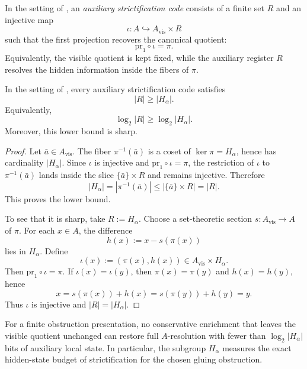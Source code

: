 \begin{definition}\label{def:auxiliary-strictification-code}
In the setting of , an \emph{auxiliary strictification code} consists of a finite set $R$ and an injective map
\[
\iota:A\hookrightarrow A_{\mathrm{vis}}\times R
\]
such that the first projection recovers the canonical quotient:
\[
\mathrm{pr}_1\circ\iota=\pi.
\]
Equivalently, the visible quotient is kept fixed, while the auxiliary register $R$ resolves the hidden information inside the fibers of $\pi$.
\end{definition}

\begin{theorem}\label{thm:minimal-information-cost-of-strictification}
In the setting of , every auxiliary strictification code satisfies
\[
|R|\ge |H_\alpha|.
\]
Equivalently,
\[
\log_2 |R|\ge \log_2 |H_\alpha|.
\]
Moreover, this lower bound is sharp.
\end{theorem}

\begin{proof}
Let $\bar a\in A_{\mathrm{vis}}$. The fiber $\pi^{-1}(\bar a)$ is a coset of $\ker\pi=H_\alpha$, hence has cardinality $|H_\alpha|$. Since $\iota$ is injective and $\mathrm{pr}_1\circ\iota=\pi$, the restriction of $\iota$ to $\pi^{-1}(\bar a)$ lands inside the slice $\{\bar a\}\times R$ and remains injective. Therefore
\[
|H_\alpha|=|\pi^{-1}(\bar a)|\le |\{\bar a\}\times R|=|R|.
\]
This proves the lower bound.

To see that it is sharp, take $R:=H_\alpha$. Choose a set-theoretic section $s:A_{\mathrm{vis}}\to A$ of $\pi$. For each $x\in A$, the difference
\[
h(x):=x-s(\pi(x))
\]
lies in $H_\alpha$. Define
\[
\iota(x):=(\pi(x),h(x))\in A_{\mathrm{vis}}\times H_\alpha.
\]
Then $\mathrm{pr}_1\circ\iota=\pi$. If $\iota(x)=\iota(y)$, then $\pi(x)=\pi(y)$ and $h(x)=h(y)$, hence
\[
x=s(\pi(x))+h(x)=s(\pi(y))+h(y)=y.
\]
Thus $\iota$ is injective and $|R|=|H_\alpha|$.
\end{proof}

\begin{corollary}\label{cor:conservative-recovery-budget}
For a finite obstruction presentation, no conservative enrichment that leaves the visible quotient unchanged can restore full $A$-resolution with fewer than $\log_2|H_\alpha|$ bits of auxiliary local state. In particular, the subgroup $H_\alpha$ measures the exact hidden-state budget of strictification for the chosen gluing obstruction.
\end{corollary}

